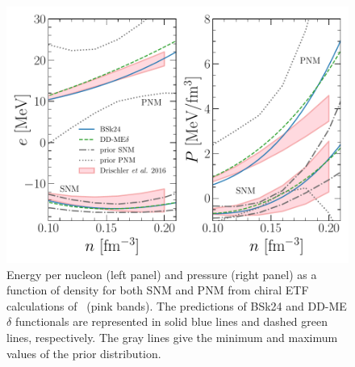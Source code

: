 \begin{figure}[!t]
\begin{center}
  \includegraphics[width=0.9\linewidth]{figures/drischler.pdf}
\end{center}
\caption[Energy per nucleon and pressure of nuclear matter versus density from 
chiral effective field theory caclulations]{Energy per nucleon 
  (left panel) and pressure (right panel) as a function of density for both SNM 
  and PNM from chiral ETF calculations of~\cite{Drischler2016} (pink
bands). The predictions of BSk24 and DD-ME$\delta$ functionals are represented 
in solid blue lines and dashed green lines, respectively. The gray lines
give the minimum and maximum values of the prior 
distribution.}\label{fig:drischler}
\end{figure}

